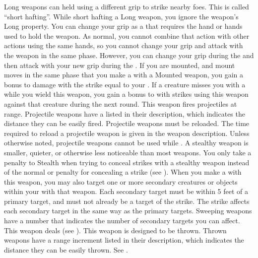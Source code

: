             Long weapons can held using a different grip to strike nearby foes.
            This is called ``short hafting''.
            While short hafting a Long weapon, you ignore the weapon's Long property.
            You can change your grip as a  that requires the hand or hands used to hold the weapon.
            As normal, you cannot combine that action with other actions using the same hands, so you cannot change your grip and attack with the weapon in the same phase.
            However, you can change your grip during the  and then attack with your new grip during the .
            \label{Mounted Weapon} If you are mounted, and mount moves in the same phase that you make a  with a Mounted weapon, you gain a bonus to damage with the strike equal to your .
             If a creature misses you with a  while you wield this weapon, you gain a  bonus to  with strikes using this weapon against that creature during the next round.
             This weapon fires projectiles at range. Projectile weapons have a  listed in their description, which indicates the distance they can be easily fired. Projectile weapons must be reloaded. The time required to reload a projectile weapon is given in the weapon description.
            Unless otherwise noted, projectile weapons cannot be used while \prone.
            A stealthy weapon is smaller, quieter, or otherwise less noticeable than most weapons.
            You only take a  penalty to Stealth when trying to conceal strikes with a stealthy weapon instead of the normal  or  penalty for concealing a strike (see ).
            \label{Sweeping} When you make a   with this weapon, you may also target one or more secondary creatures or objects within your  with that weapon.
            Each secondary target must be within 5 feet of a primary target, and must not already be a target of the strike.
            The strike affects each secondary target in the same way as the primary targets.
            Sweeping weapons have a number that indicates the number of secondary targets you can affect.
             This weapon deals  (see ).
             This weapon is designed to be thrown. Thrown weapons have a range increment listed in their description, which indicates the distance they can be easily thrown. See .
